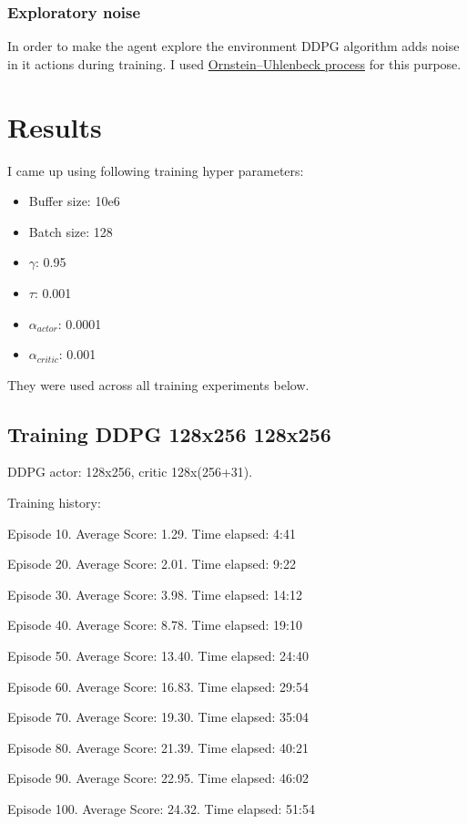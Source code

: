 \documentclass{report}
\begin{document}
\subsubsection*{Exploratory noise}
In order to make the agent explore the environment DDPG algorithm adds noise in it actions during training. I used \href{https://en.wikipedia.org/wiki/Ornstein-Uhlenbeck_process}{Ornstein–Uhlenbeck process} for this purpose.


\section*{Results}

I came up using following training hyper parameters:
\begin{itemize}
	\item Buffer size: 10e6
	\item Batch size: 128
	\item \(\gamma\): 0.95
	\item \(\tau\): 0.001
	\item \(\alpha_{actor}\): 0.0001
	\item \(\alpha_{critic}\): 0.001
\end{itemize}
They were used across all training experiments below.


\subsection*{Training DDPG 128x256 128x256}

DDPG actor: 128x256, critic 128x(256+31).

Training history:

Episode 10.	Average Score: 1.29.	Time elapsed: 4:41

Episode 20.	Average Score: 2.01.	Time elapsed: 9:22

Episode 30.	Average Score: 3.98.	Time elapsed: 14:12

Episode 40.	Average Score: 8.78.	Time elapsed: 19:10

Episode 50.	Average Score: 13.40.	Time elapsed: 24:40

Episode 60.	Average Score: 16.83.	Time elapsed: 29:54

Episode 70.	Average Score: 19.30.	Time elapsed: 35:04

Episode 80.	Average Score: 21.39.	Time elapsed: 40:21

Episode 90.	Average Score: 22.95.	Time elapsed: 46:02

Episode 100.	Average Score: 24.32.	Time elapsed: 51:54
\end{document}
